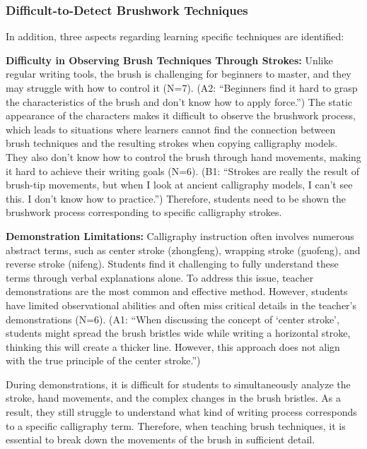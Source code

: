 \subsubsection{Difficult-to-Detect Brushwork Techniques} In addition, three aspects regarding learning specific techniques are identified:

\textbf{Difficulty in Observing Brush Techniques Through Strokes:} Unlike regular writing tools, the brush is challenging for beginners to master, and they may struggle with how to control it (N=7). (A2: ``Beginners find it hard to grasp the characteristics of the brush and don't know how to apply force.'') The static appearance of the characters makes it difficult to observe the brushwork process, which leads to situations where learners cannot find the connection between brush techniques and the resulting strokes when copying calligraphy models. They also don't know how to control the brush through hand movements, making it hard to achieve their writing goals (N=6). (B1: ``Strokes are really the result of brush-tip movements, but when I look at ancient calligraphy models, I can't see this. I don't know how to practice.'') Therefore, students need to be shown the brushwork process corresponding to specific calligraphy strokes.

\textbf{Demonstration Limitations:} Calligraphy instruction often involves numerous abstract terms, such as center stroke (zhongfeng), wrapping stroke (guofeng), and reverse stroke (nifeng). Students find it challenging to fully understand these terms through verbal explanations alone. To address this issue, teacher demonstrations are the most common and effective method. However, students have limited observational abilities and often miss critical details in the teacher's demonstrations (N=6). (A1: ``When discussing the concept of `center stroke', students might spread the brush bristles wide while writing a horizontal stroke, thinking this will create a thicker line. However, this approach does not align with the true principle of the center stroke.'')

During demonstrations, it is difficult for students to simultaneously analyze the stroke, hand movements, and the complex changes in the brush bristles. As a result, they still struggle to understand what kind of writing process corresponds to a specific calligraphy term. Therefore, when teaching brush techniques, it is essential to break down the movements of the brush in sufficient detail.

